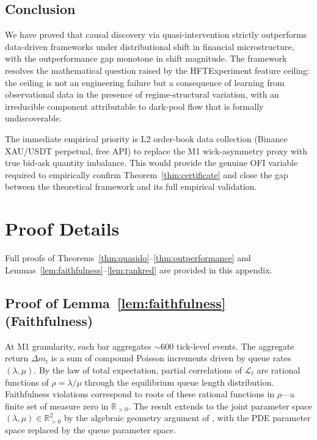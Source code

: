 \documentclass[12pt]{article}
\begin{document}
\subsection{Conclusion}

We have proved that causal discovery via quasi-intervention strictly
outperforms data-driven frameworks under distributional shift in
financial microstructure, with the outperformance gap monotone in
shift magnitude.
The framework resolves the mathematical question raised by the
HFTExperiment feature ceiling: the ceiling is not an engineering
failure but a consequence of learning from observational data in the
presence of regime-structural variation, with an irreducible component
attributable to dark-pool flow that is formally undiscoverable.

The immediate empirical priority is L2 order-book data collection
(Binance XAU/USDT perpetual, free API) to replace the M1 wick-asymmetry
proxy with true bid-ask quantity imbalance.
This would provide the genuine OFI variable required to empirically
confirm Theorem~\ref{thm:certificate} and close the gap between the
theoretical framework and its full empirical validation.




\appendix
\section{Proof Details}

Full proofs of Theorems~\ref{thm:quasido}--\ref{thm:outperformance}
and Lemmas~\ref{lem:faithfulness}--\ref{lem:rankred}
are provided in this appendix.

\subsection{Proof of Lemma~\ref{lem:faithfulness} (Faithfulness)}
At M1 granularity, each bar aggregates $\sim$600 tick-level events.
The aggregate return $\Delta m_t$ is a sum of compound Poisson increments
driven by queue rates $(\lambda, \mu)$.
By the law of total expectation, partial correlations of
$\mathcal{L}_t$ are rational functions of $\rho = \lambda/\mu$
through the equilibrium queue length distribution.
Faithfulness violations correspond to roots of these rational functions
in $\rho$---a finite set of measure zero in $\mathbb{R}_{>0}$.
The result extends to the joint parameter space
$(\lambda, \mu) \in \mathbb{R}^2_{>0}$ by the algebraic geometry
argument of \citet{maes2026b}, with the PDE parameter space replaced
by the queue parameter space.
\end{document}
